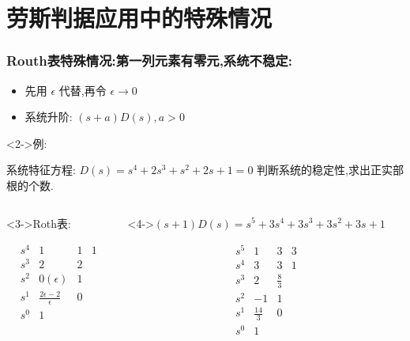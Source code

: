 \documentclass{beamer}
\begin{document}
\section{劳斯判据应用中的特殊情况}
\label{sec-4}
\begin{frame}
\frametitle{Routh表特殊情况:第一列元素有零元,系统不稳定:}
\label{sec-4-1}

\begin{itemize}
\item 先用 $\epsilon$ 代替,再令 $\epsilon\rightarrow 0$
\item 系统升阶: $(s+a)D(s),a>0$
\end{itemize}
\begin{block}<2->{例:}
\label{sec-4-1-1}

系统特征方程: $D(s)=s^{4}+2s^{3}+s^{2}+2s+1=0$ 判断系统的稳定性,求出正实部根的个数.
\end{block}
\begin{columns}
\begin{column}{0.3\textwidth}
\begin{block}<3->{Roth表:}
\label{sec-4-1-2}


\[
\begin{matrix}
s^{4}   &  1  &   1  & 1 \\
s^{3}   &  2  &  2  \\
s^{2}   &  0(\epsilon)  &  1   \\
s^{1}   &  \frac{2\epsilon-2}{\epsilon} & 0 \\
s^{0}   &  1   \\
\end{matrix}
\]
\end{block}
\end{column}
\begin{column}{0.7\textwidth}
\begin{block}<4->{$(s+1)D(s)=s^{5}+3s^{4}+3s^{3}+3s^{2}+3s+1$}
\label{sec-4-1-3}


\[
\begin{matrix}
s^{5} & 1 & 3 & 3 \\
s^{4} & 3 & 3 & 1 \\
s^{3} & 2 & \frac{8}{3} \\
s^{2} & -1 & 1 \\
s^{1} & \frac{14}{3} & 0 \\
s^{0} & 1
\end{matrix}
\]
\end{block}
\end{column}
\end{columns}
\end{frame}
\end{document}
